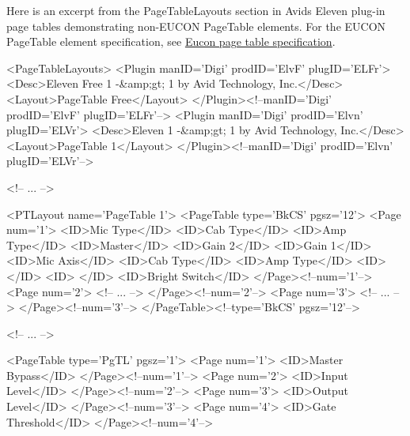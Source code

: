 Here is an excerpt from the {\ttfamily Page\+Table\+Layouts} section in Avid\textquotesingle{}s Eleven plug-\/in page tables demonstrating non-\/\+E\+U\+C\+O\+N {\ttfamily Page\+Table} elements. For the E\+U\+C\+O\+N {\ttfamily Page\+Table} element specification, see \hyperlink{a00363_subsection_eucon_page_tables_specification}{Eucon page table specification}.


\begin{DoxyCode}
<PageTableLayouts>
    <Plugin manID=\textcolor{stringliteral}{'Digi'} prodID=\textcolor{stringliteral}{'ElvF'} plugID=\textcolor{stringliteral}{'ELFr'}>
        <Desc>Eleven Free 1 -&amp;gt; 1 by Avid Technology, Inc.</Desc>
        <Layout>PageTable Free</Layout>
    </Plugin><!--manID=\textcolor{stringliteral}{'Digi'} prodID=\textcolor{stringliteral}{'ElvF'} plugID=\textcolor{stringliteral}{'ELFr'}-->
    <Plugin manID=\textcolor{stringliteral}{'Digi'} prodID=\textcolor{stringliteral}{'Elvn'} plugID=\textcolor{stringliteral}{'ELVr'}>
        <Desc>Eleven 1 -&amp;gt; 1 by Avid Technology, Inc.</Desc>
        <Layout>PageTable 1</Layout>
    </Plugin><!--manID=\textcolor{stringliteral}{'Digi'} prodID=\textcolor{stringliteral}{'Elvn'} plugID=\textcolor{stringliteral}{'ELVr'}-->
    
    <!--     ...     -->
    
    <PTLayout name=\textcolor{stringliteral}{'PageTable 1'}>
        <PageTable type=\textcolor{stringliteral}{'BkCS'} pgsz=\textcolor{stringliteral}{'12'}>
            <Page num=\textcolor{charliteral}{'1'}>
                <ID>Mic Type</ID>
                <ID>Cab Type</ID>
                <ID>Amp Type</ID>
                <ID>Master</ID>
                <ID>Gain 2</ID>
                <ID>Gain 1</ID>
                <ID>Mic Axis</ID>
                <ID>Cab Type</ID>
                <ID>Amp Type</ID>
                <ID> </ID>
                <ID> </ID>
                <ID>Bright Switch</ID>
            </Page><!--num=\textcolor{charliteral}{'1'}-->
            <Page num=\textcolor{charliteral}{'2'}>
                <!--     ...     -->
            </Page><!--num=\textcolor{charliteral}{'2'}-->
            <Page num=\textcolor{charliteral}{'3'}>
                <!--     ...     -->
            </Page><!--num=\textcolor{charliteral}{'3'}-->
        </PageTable><!--type=\textcolor{stringliteral}{'BkCS'} pgsz=\textcolor{stringliteral}{'12'}-->
        
        <!--     ...     -->
        
        <PageTable type=\textcolor{stringliteral}{'PgTL'} pgsz=\textcolor{charliteral}{'1'}>
            <Page num=\textcolor{charliteral}{'1'}>
                <ID>Master Bypass</ID>
            </Page><!--num=\textcolor{charliteral}{'1'}-->
            <Page num=\textcolor{charliteral}{'2'}>
                <ID>Input Level</ID>
            </Page><!--num=\textcolor{charliteral}{'2'}-->
            <Page num=\textcolor{charliteral}{'3'}>
                <ID>Output Level</ID>
            </Page><!--num=\textcolor{charliteral}{'3'}-->
            <Page num=\textcolor{charliteral}{'4'}>
                <ID>Gate Threshold</ID>
            </Page><!--num=\textcolor{charliteral}{'4'}-->
            

\end{DoxyCode}

